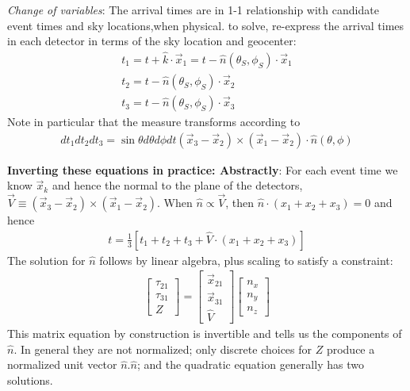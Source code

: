 \documentclass[twocolumn,prd,nofootinbib]{revtex4}
\begin{document}
\begin{widetext}
{\noindent \emph{Change of variables}: The arrival times are in 1-1 relationship with candidate
event times and sky locations,when physical.  to solve, re-express the arrival times in each detector in terms of the
sky location and geocenter:
\begin{eqnarray}
t_1 = t + \hat{k}\cdot \vec{x}_1 
      = t - \hat{n}(\theta_S,\phi_S)\cdot \vec{x}_1 \\
t_2  = t - \hat{n}(\theta_S,\phi_S)\cdot \vec{x}_2 \\
t_3  = t - \hat{n}(\theta_S,\phi_S)\cdot \vec{x}_3 
\end{eqnarray}
Note in particular that the measure transforms according to
\begin{eqnarray}
 dt_1 dt_2 dt_3  = \sin\theta d\theta d\phi dt (\vec{x}_3-\vec{x}_2)\times(\vec{x}_1-\vec{x}_2)\cdot\hat{n}(\theta,\phi)
\end{eqnarray}

\begin{shaded}
\noindent \textbf{Inverting these equations in practice: Abstractly}: For each event time we know $\vec{x}_k$ and hence the normal
to the plane of the detectors, $\vec{V}\equiv (\vec{x}_3 -\vec{x}_2)\times(\vec{x}_1-\vec{x}_2)$.  When $\hat{n}\propto
\vec{V}$, then $\hat{n}\cdot (x_1+x_2+x_3)=0$ and hence
\begin{eqnarray}
t = \frac{1}{3}[t_1+t_2+t_3 + \hat{V}\cdot(x_1+x_2+x_3)] 
\end{eqnarray}
The solution for $\hat{n}$ follows by linear algebra, plus scaling to satisfy a constraint:
\begin{eqnarray}
\begin{bmatrix}
\tau_{21} \\ \tau_{31} \\ Z
\end{bmatrix}
=
\begin{bmatrix}
\vec{x}_{21} \\ \vec{x}_{31} \\  \hat{V}
\end{bmatrix}
\begin{bmatrix}
n_x \\ n_y \\ n_z
\end{bmatrix}
\end{eqnarray}
This matrix equation by construction is invertible and tells us the components of $\hat{n}$.  In general they are not
normalized; only discrete choices for $Z$ produce a normalized unit vector $\hat{n}.\hat{n}$; and the quadratic equation
generally has two solutions.


\end{shaded}}
\end{widetext}
\end{document}
